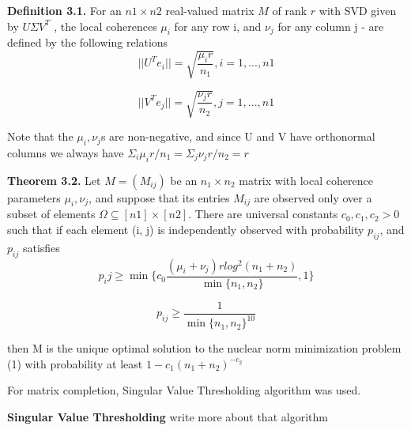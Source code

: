 \documentclass{article}
\begin{document}
\textbf{Definition 3.1.} For an $n1 \times n2$ real-valued matrix $M$ of
rank $r$ with SVD given by $U \Sigma V^T$ , the local coherences $ \mu_i$ for any row i, and $\nu_j$ for any column j - are defined by
the following relations
\begin{equation}
||U^Te_i|| = \sqrt{\frac{\mu_i r}{n_1}} , i = 1, . . . , n1
\end{equation}

\begin{equation}
    ||V^Te_j|| = \sqrt{\frac{\nu_j r}{n_2}} , j = 1, . . . , n1
\end{equation}

Note that the $\mu_i, \nu_j$s are non-negative, and since U and V
have orthonormal columns we always have $\Sigma_i \mu_i r/n_1 =
\Sigma_j \nu_j r/n_2  = r$

\textbf{Theorem 3.2.} Let $M = (M_{ij})$ be an $n_1 \times n_2$ matrix with local coherence parameters ${\mu_i,\nu_j}$, and suppose that its entries $M_{ij}$ are observed only over a subset of elements  $ \Omega \subseteq [n1] \times [n2]$. There are universal constants $c_0, c_1, c_2 >
0 $such that if each element (i, j) is independently observed
with probability $p_{ij}$, and $p_{ij}$ satisfies 
\begin{equation}
    p_ij \geq \min \{ c_0\frac{(\mu_i + \nu_j)rlog^2( n_1 + n_2)}{\min \{n_1, n_2\}}, 1 \}
\end{equation} 

\begin{equation}
    p_{ij} \geq \frac{1}{\min \{n_1,n_2\}^{10}} 
\end{equation}
 

then M is the unique optimal solution to the nuclear norm minimization problem (1) with probability at least $1-c_1(n_1 + n_2)^{-c_2}$



For matrix completion, Singular Value Thresholding algorithm was used.\cite{CaiACOMPLETION}

\textbf{Singular Value Thresholding}
write more about that algorithm
\end{document}
